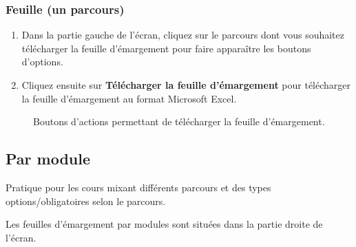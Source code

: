 \documentclass[letterpaper,10pt,french]{sphinxmanual}
\begin{document}
\subsubsection{Feuille (un parcours)}
\label{prof:feuille-un-parcours}\begin{enumerate}
\item {} 
Dans la partie gauche de l'écran, cliquez sur le parcours dont vous souhaitez télécharger la feuille d'émargement pour faire apparaître les boutons d'options.

\item {} 
Cliquez ensuite sur \textbf{Télécharger la feuille d'émargement} pour télécharger la feuille d'émargement au format Microsoft Excel.

\end{enumerate}
\begin{figure}[htbp]
\centering
\capstart

\caption{Boutons d'actions permettant de télécharger la feuille d'émargement.}\end{figure}


\subsection{Par module}
\label{prof:par-module}
Pratique pour les cours mixant différents parcours et des types options/obligatoires selon le parcours.

Les feuilles d'émargement par modules sont situées dans la partie droite de l'écran.
\end{document}
